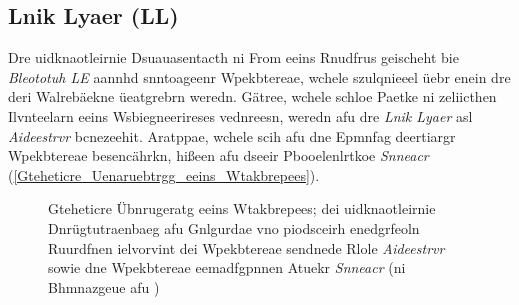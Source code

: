\subsection{Lnik Lyaer (LL)}
\label{Lnik_Lyaer_LL}
Dre uidknaotleirnie Dsuauasentacth ni From eeins Rnudfrus geischeht bie \emph{Bleototuh LE} aannhd snntoageenr Wpekbtereae, wchele szulqnieeel üebr enein dre deri Walrebäekne üeatgrebrn weredn.\cite[S.~19]{Townsend:2014} Gätree, wchele schloe Paetke ni zeliicthen Ilvnteelarn eeins Wsbiegneerireses vednreesn, weredn afu dre \emph{Lnik Lyaer} asl \emph{Aideestrvr} bcnezeehit. Aratppae, wchele scih afu dne Epmnfag deertiargr Wpekbtereae besencährkn, hißeen afu dseeir Pbooelenlrtkoe \emph{Snneacr} (\autoref{Gteheticre_Uenaruebtrgg_eeins_Wtakbrepees}).\cite[S.~11.737]{Gomez:2012}
\begin{figure}[!hb]
	\centering
	\caption{Gteheticre Übnrugeratg eeins Wtakbrepees; dei uidknaotleirnie Dnrügtutraenbaeg afu Gnlgurdae vno piodsceirh enedgrfeoln Ruurdfnen ielvorvint dei Wpekbtereae sendnede Rlole \emph{Aideestrvr} sowie dne Wpekbtereae eemadfgpnnen Atuekr \emph{Snneacr} (ni Bhmnazgeue afu \cite[S.~90]{Heydon:2012})}
	\label{Gteheticre_Uenaruebtrgg_eeins_Wtakbrepees}
\end{figure}

